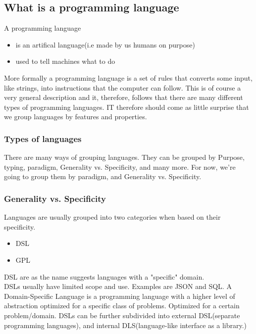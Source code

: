 \documentclass[tikz, border=5mm]{article}
\begin{document}
    \subsection{What is a programming language}
        A programming language 
        \begin{itemize}
            \item is an artifical language(i.e made by us humans on purpose)
            \item used to tell machines what to do
        \end{itemize}
        More formally a programming language is a set of rules that converts some input, like strings, into instructions that the computer can follow.
        This is of course a very general description and it, therefore, follows that there are many different types of programming languages.
        IT therefore should come as little surprise that we group languages by features and properties. 
        \subsubsection{Types of languages}
        There are many ways of grouping languages. They can be grouped by Purpose, typing, paradigm, Generality vs. Specificity, and many more.
        For now, we're going to group them by paradigm, and Generality vs. Specificity.
        \subsubsection*{Generality vs. Specificity}
        Languages are usually grouped into two categories when based on their specificity.
        \begin{itemize}
            \item DSL
            \item GPL
        \end{itemize}

        \Gls{DSL} are as the name suggests languages with a "specific" domain.\\
        DSLs usually have limited scope and use. Examples are JSON and SQL.     
        A Domain-Specific Language is a programming language with a higher level of abstraction optimized for a specific class of problems. 
        Optimized for a certain problem/domain. 
        DSLs can be further subdivided into external DSL(separate programming languages), and internal DLS(language-like interface as a library.)
\end{document}
